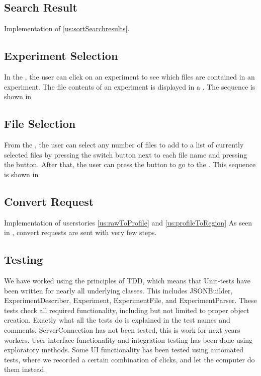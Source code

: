 \subsection{Search Result}
Implementation of \ref{us:sortSearchresults}.

\subsection{Experiment Selection}

In the , the user can click on an experiment to see which files are contained in an experiment. The file contents of an experiment is displayed in a . The sequence is shown in  


\subsection{File Selection}

From the , the user can select any number of files to add to a list of currently selected files by pressing the switch button next to each file name and pressing the  button. After that, the user can press the  button to go to the . This sequence is shown in 


\subsection{Convert Request}
Implementation of userstories \ref{us:rawToProfile} and \ref{us:profileToRegion}
As seen in , convert requests are sent with very few steps. 


\subsection{Testing}

We have worked using the principles of TDD, which means that Unit-tests have been written for nearly all underlying classes. This includes JSONBuilder, ExperimentDescriber, Experiment, ExperimentFile, and ExperimentParser. These tests check all required functionality, including but not limited to proper object creation. Exactly what all the tests do is explained in the test names and comments. ServerConnection has not been tested, this is work for next years workers. User interface functionality and integration testing has been done using exploratory methods. Some UI functionality has been tested using automated tests, where we recorded a certain combination of clicks, and let the computer do them instead. 
\fi
